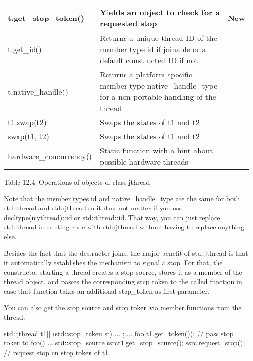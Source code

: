 \begin{longtable}[c]{|l|l|l|}
t.get\_stop\_token()    & Yields an object to check for a requested stop                                                         & New           \\ \hline
t.get\_id()             & Returns a unique thread ID of the member type id if joinable or a default constructed ID if not        &               \\ \hline
t.native\_handle() &
Returns a platform-specific member type native\_handle\_type for a non-portable handling of the thread &
\\ \hline
t1.swap(t2)             & Swaps the states of t1 and t2                                                                          &               \\ \hline
swap(t1, t2)            & Swaps the states of t1 and t2                                                                          &               \\ \hline
hardware\_concurrency() & Static function with a hint about possible hardware threads                                            &               \\ \hline
\end{longtable}

\begin{center}
Table 12.4. Operations of objects of class jthread
\end{center}

Note that the member types id and native\_handle\_type are the same for both std::thread and std::jthread so it does not matter if you use decltype(mythread)::id or std::thread::id. That way, you can just replace std::thread in existing code with std::jthread without having to replace anything else.


Besides the fact that the destructor joins, the major benefit of std::jthread is that it automatically establishes the mechanism to signal a stop. For that, the constructor starting a thread creates a stop source, stores it as a member of the thread object, and passes the corresponding stop token to the called function in case that function takes an additional stop\_token as first parameter.

You can also get the stop source and stop token via member functions from the thread:

\begin{cpp}
std::jthread t1{[] (std::stop_token st) {
						...
				}};
...
foo(t1.get_token()); // pass stop token to foo()
...
std::stop_source ssrc{t1.get_stop_source()};
ssrc.request_stop(); // request stop on stop token of t1
\end{cpp}

